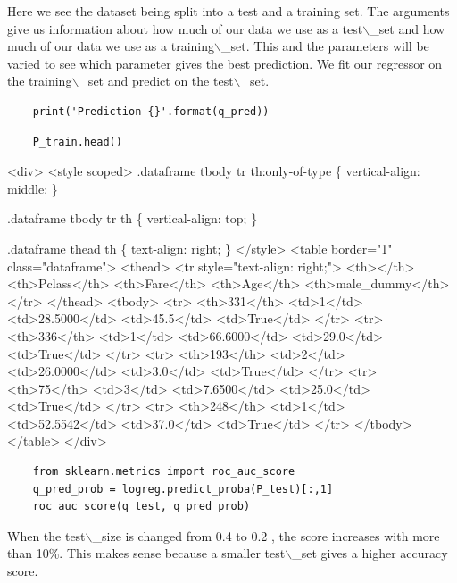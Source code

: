 \documentclass[11pt]{article}
\begin{document}
Here we see the dataset being split into a test and a training set. The
arguments give us information about how much of our data we use as a
test$\backslash$\_set and how much of our data we use as a training$\backslash$\_set. This and
the parameters will be varied to see which parameter gives the best
prediction. We fit our regressor on the training$\backslash$\_set and predict on the
test$\backslash$\_set.

\begin{verbatim}
    print('Prediction {}'.format(q_pred))
\end{verbatim}

\begin{verbatim}
    P_train.head()
\end{verbatim}

\begin{HTML}
<div>
<style scoped>
    .dataframe tbody tr th:only-of-type \{
	vertical-align: middle;
    \}

.dataframe tbody tr th \{
    vertical-align: top;
\}

    .dataframe thead th \{
	text-align: right;
    \}
</style>
<table border="1" class="dataframe">
  <thead>
    <tr style="text-align: right;">
      <th></th>
      <th>Pclass</th>
      <th>Fare</th>
      <th>Age</th>
      <th>male\_dummy</th>
    </tr>
  </thead>
  <tbody>
    <tr>
      <th>331</th>
      <td>1</td>
      <td>28.5000</td>
      <td>45.5</td>
      <td>True</td>
    </tr>
    <tr>
      <th>336</th>
      <td>1</td>
      <td>66.6000</td>
      <td>29.0</td>
      <td>True</td>
    </tr>
    <tr>
      <th>193</th>
      <td>2</td>
      <td>26.0000</td>
      <td>3.0</td>
      <td>True</td>
    </tr>
    <tr>
      <th>75</th>
      <td>3</td>
      <td>7.6500</td>
      <td>25.0</td>
      <td>True</td>
    </tr>
    <tr>
      <th>248</th>
      <td>1</td>
      <td>52.5542</td>
      <td>37.0</td>
      <td>True</td>
    </tr>
  </tbody>
</table>
</div>
\end{HTML}

\begin{verbatim}
    from sklearn.metrics import roc_auc_score
    q_pred_prob = logreg.predict_proba(P_test)[:,1]
    roc_auc_score(q_test, q_pred_prob)
\end{verbatim}

When the test$\backslash$\_size is changed from 0.4 to 0.2 , the score increases
with more than 10\%. This makes sense because a smaller test$\backslash$\_set gives a
higher accuracy score.
\end{document}
